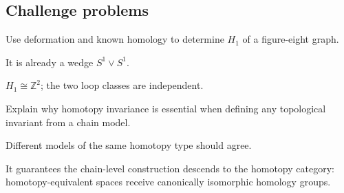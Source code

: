 \subsection*{Challenge problems}

\begin{exercise}\label{exr:viii20-ped-15}
Use deformation and known homology to determine $H_1$ of a figure-eight graph.
\end{exercise}
\begin{hint}
It is already a wedge $S^1\vee S^1$.
\end{hint}
\begin{solution}
$H_1\cong\mathbb Z^2$; the two loop classes are independent.
\end{solution}

\begin{exercise}\label{exr:viii20-ped-16}
Explain why homotopy invariance is essential when defining any topological invariant from a chain model.
\end{exercise}
\begin{hint}
Different models of the same homotopy type should agree.
\end{hint}
\begin{solution}
It guarantees the chain-level construction descends to the homotopy category: homotopy-equivalent spaces receive canonically isomorphic homology groups.
\end{solution}

